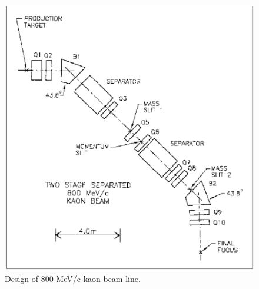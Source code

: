\begin{figure}[H]
\centerline{\includegraphics[width=15cm]{FigC2-1.ps}}
\vfill

\caption{\label{figC21}Design of 800 MeV/c kaon beam line.}
\end{figure}

\vfill


